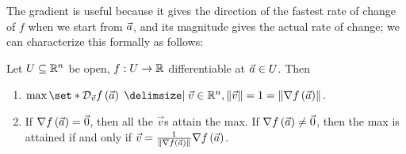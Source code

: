 \documentclass[main.tex]{subfiles}
\begin{document}
The gradient is useful because it gives the direction of the fastest rate of change of $f$ when we start from $\vec{a}$, and its magnitude gives the actual rate of change; we can characterize this formally as follows:

\begin{lemma}
    Let $U\subseteq \mathbb R^n$ be open, $f : U \to \mathbb R$ differentiable at $\vec{a}\in U$. Then
    \begin{enumerate}
        \item $\max\set*{\mathcal{D}_{\vec{v}} f \parens{\va} \mid \vec{v}\in \RR^n, \norm{\vec{v}} = 1} = \norm{\nabla f\parens{\va}}$.
        \item If $\nabla f\left( \vec{a} \right) = \vec{0}$, then all the $\vec{v}$s attain the max. If $\nabla f\left( \vec{a} \right) \neq \vec{0}$, then the max is attained if and only if $\vec{v} = \frac{1}{\left\lVert \nabla f\left( \vec{a} \right) \right\rVert}\nabla f\left( \vec{a} \right)$.
    \end{enumerate}
\end{lemma}
\end{document}
